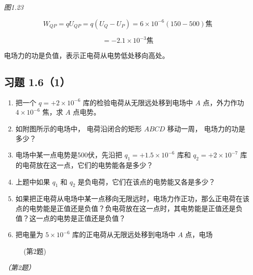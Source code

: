 \emph{图1.23}

\[
W_{Q P} = q U_{Q P} = q (U_{Q} - U_{P}) = 6 \times 10^{- 6} (150 - 500) \text{焦}
\]

\[
= - 2.1 \times 10^{- 3} \text{焦}
\]

电场力的功是负值，表示正电荷从电势低处移向高处。

\subsection{习题 1.6（1）}\label{ux4e60ux9898-1.61}

\begin{enumerate}
\def\labelenumi{\arabic{enumi}.}
\item
  把一个 \(q = +2 \times 10^{-6}\) 库的检验电荷从无限远处移到电场中
  \(A\) 点，外力作功 \(4 \times 10^{-6}\) 焦，求 \(A\) 点电势。
\item
  如附图所示的电场中， 电荷沿闭合的矩形 \(A B C D\) 移动一周，
  电场力的功是多少？
\item
  电场中某一点电势是500伏，先沿把 \(q_{1}=+1.5\times10^{-6}\) 库和
  \(q_{2}=+2\times10^{-7}\) 库的电荷放在这一点，它们的电势能各是多少？
\item
  上题中如果 \(q_{1}\) 和 \(q_{2}\)
  是负电荷，它们在该点的电势能又各是多少？
\item
  如果把正电荷从电场中某一点移向无限远时，电场力作正功，那么正电荷在该点的电势能是正值还是负值？负电荷放在这一点时，其电势能是正值还是负值？这一点的电势是正值还是负值？
\item
  把电量为 \(5 \times 10^{-6}\) 库的正电荷从无限远处移到电场中 \(A\)
  点，电场
\end{enumerate}

\begin{figure}
\centering
{}
\caption{(第2题)}
\end{figure}

\emph{（第2题）}

